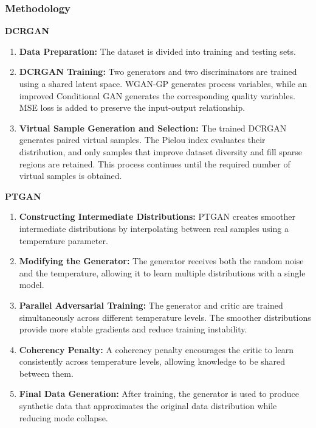 \documentclass[12pt,a4paper]{article}
\begin{document}
\subsubsection{Methodology}
\textbf{DCRGAN}
\begin{enumerate}
    \item \textbf{Data Preparation:} The dataset is divided into training and testing sets.

    \item \textbf{DCRGAN Training:} Two generators and two discriminators are trained using a shared latent space. WGAN-GP generates process variables, while an improved Conditional GAN generates the corresponding quality variables. MSE loss is added to preserve the input-output relationship.

    \item \textbf{Virtual Sample Generation and Selection:} The trained DCRGAN generates paired virtual samples. The Pielou index evaluates their distribution, and only samples that improve dataset diversity and fill sparse regions are retained. This process continues until the required number of virtual samples is obtained.
\end{enumerate}
\textbf{PTGAN}
\begin{enumerate}
    \item \textbf{Constructing Intermediate Distributions:} PTGAN creates smoother intermediate distributions by interpolating between real samples using a temperature parameter.
    
    \item \textbf{Modifying the Generator:} The generator receives both the random noise and the temperature, allowing it to learn multiple distributions with a single model.
    
    \item \textbf{Parallel Adversarial Training:} The generator and critic are trained simultaneously across different temperature levels. The smoother distributions provide more stable gradients and reduce training instability.
    
    \item \textbf{Coherency Penalty:} A coherency penalty encourages the critic to learn consistently across temperature levels, allowing knowledge to be shared between them.
    
    \item \textbf{Final Data Generation:} After training, the generator is used to produce synthetic data that approximates the original data distribution while reducing mode collapse.
\end{enumerate}
\end{document}
